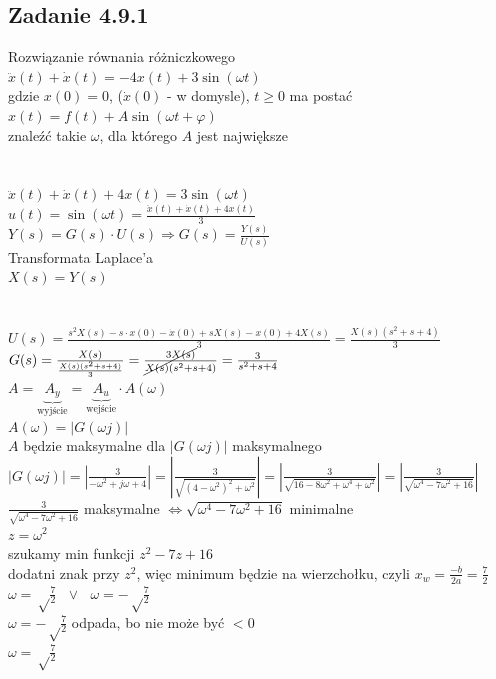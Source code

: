 \pagebreak
\subsection*{Zadanie 4.9.1} {\color{darkgray}
	Rozwiązanie równania różniczkowego\\
	$\ddot{x}(t)+\dot{x}(t)=-4x(t)+3\sin({\omega t})$\\
	gdzie $x(0)=0$, ($\dot{x}(0)$ - w domysle), $t \geq 0$ ma postać\\
	$x(t)=f(t)+A\sin({\omega t+\varphi})$\\
	znaleźć takie $\omega$, dla którego $A$ jest największe\\
}\lineh
\\\\
$\ddot{x}(t)+\dot{x}(t)+4x(t)=3\sin({\omega t})$\\
$u(t)=\sin(\omega t)=\frac{\ddot{x}(t)+\dot{x}(t)+4x(t)}{3}$\\
$Y(s)=G(s)\cdot U(s) \Rightarrow G(s)=\frac{Y(s)}{U(s)}$\\
Transformata Laplace'a\\
$X(s)=Y(s)$\\
\\\\
$U(s)=\frac{s^2X(s)-s\cdot x(0)-\dot{x}(0)+sX(s)-x(0)+4X(s)}{3}=\frac{X(s)(s^2+s+4)}{3}$\\
$G(s)=\frac{X(s)}{\frac{X(s)(s^2+s+4)}{3}}=\frac{3 \cancel{X(s)}}{ \cancel{X(s)}(s^2+s+4)}=\frac{3}{s^2+s+4}$\\
$A=\underbrace{A_y}_{\text{wyjście}}=\underbrace{A_u}_{\text{wejście}} \cdot A(\omega)$\\
$A(\omega)=|G(\omega j)|$\\
$A$ będzie maksymalne dla $|G(\omega j)|$ maksymalnego\\
$|G(\omega j)| = |\frac{3}{-\omega^2+j\omega+4}|=|\frac{3}{\sqrt{(4-\omega^2)^2+\omega^2}}|=|\frac{3}{\sqrt{16-8\omega^2+\omega^4+\omega^2}}|=|\frac{3}{\sqrt{\omega^4-7\omega^2+16}}|$\\
$\frac{3}{\sqrt{\omega^4-7\omega^2+16}}$ maksymalne $\Leftrightarrow \sqrt{\omega^4-7\omega^2+16}$ minimalne\\
$z=\omega^2$\\
szukamy min funkcji $z^2-7z+16$\\
dodatni znak przy $z^2$, więc minimum będzie na wierzchołku, czyli $x_w=\frac{-b}{2a}=\frac 72$\\
$\omega=\sqrt\frac 72 \ \ \ \vee \ \ \ \omega=-\sqrt\frac 72$\\
$\omega=-\sqrt\frac 72$ odpada, bo nie może być $<0$\\
$\boxed{\omega=\sqrt\frac 72}$\\





